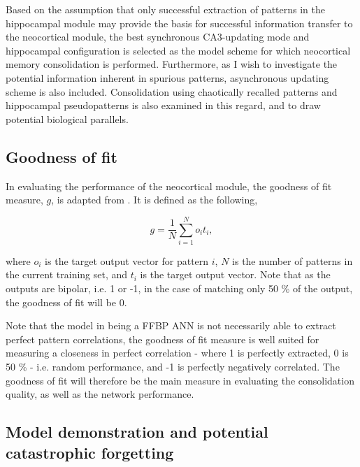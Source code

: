 Based on the assumption that only successful extraction of patterns in the hippocampal module may provide the basis for successful information transfer to the neocortical module, the best synchronous CA3-updating mode and hippocampal configuration is selected as the model scheme for which neocortical memory consolidation is performed. Furthermore, as I wish to investigate the potential information inherent in spurious patterns, asynchronous updating scheme is also included. Consolidation using chaotically recalled patterns and hippocampal pseudopatterns is also examined in this regard, and to draw potential biological parallels.


\subsection{Goodness of fit}

In evaluating the performance of the neocortical module, the goodness of fit measure, $g$, is adapted from \citep{Hattori2010, Hattori2014}. It is defined as the following,

\begin{equation}
    g = \frac{1}{N} \sum_{i=1}^{N}o_it_i,
\end{equation}

where $o_i$ is the target output vector for pattern $i$, $N$ is the number of patterns in the current training set, and $t_i$ is the target output vector. Note that as the outputs are bipolar, i.e. 1 or -1, in the case of matching only 50 \% of the output, the goodness of fit will be 0.

Note that the model in being a FFBP ANN is not necessarily able to extract perfect pattern correlations, the goodness of fit measure is well suited for measuring a closeness in perfect correlation - where 1 is perfectly extracted, 0 is 50 \% - i.e. random performance, and -1 is perfectly negatively correlated.
The goodness of fit will therefore be the main measure in evaluating the consolidation quality, as well as the network performance.

\subsection{Model demonstration and potential catastrophic forgetting}

